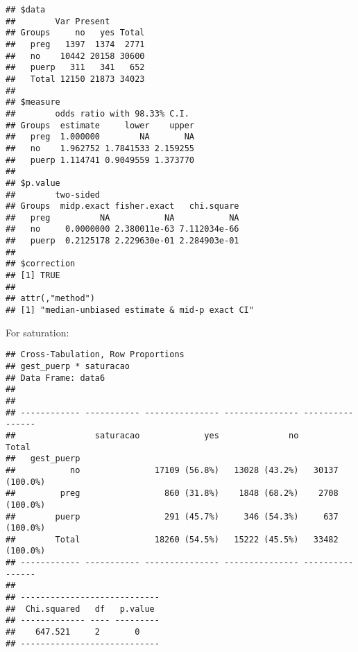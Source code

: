 \documentclass[
]{article}
\newenvironment{Shaded}{\begin{snugshade}}{\end{snugshade}}
\newcommand{\DataTypeTok}[1]{\textcolor[rgb]{0.13,0.29,0.53}{#1}}
\newcommand{\KeywordTok}[1]{\textcolor[rgb]{0.13,0.29,0.53}{\textbf{#1}}}
\newcommand{\NormalTok}[1]{#1}
\newcommand{\OperatorTok}[1]{\textcolor[rgb]{0.81,0.36,0.00}{\textbf{#1}}}
\newcommand{\OtherTok}[1]{\textcolor[rgb]{0.56,0.35,0.01}{#1}}
\newcommand{\StringTok}[1]{\textcolor[rgb]{0.31,0.60,0.02}{#1}}
\begin{document}
\begin{verbatim}
## $data
##        Var Present
## Groups     no   yes Total
##   preg   1397  1374  2771
##   no    10442 20158 30600
##   puerp   311   341   652
##   Total 12150 21873 34023
## 
## $measure
##        odds ratio with 98.33% C.I.
## Groups  estimate     lower    upper
##   preg  1.000000        NA       NA
##   no    1.962752 1.7841533 2.159255
##   puerp 1.114741 0.9049559 1.373770
## 
## $p.value
##        two-sided
## Groups  midp.exact fisher.exact   chi.square
##   preg          NA           NA           NA
##   no     0.0000000 2.380011e-63 7.112034e-66
##   puerp  0.2125178 2.229630e-01 2.284903e-01
## 
## $correction
## [1] TRUE
## 
## attr(,"method")
## [1] "median-unbiased estimate & mid-p exact CI"
\end{verbatim}

For saturation:

\begin{Shaded}
\end{Shaded}

\begin{verbatim}
## Cross-Tabulation, Row Proportions  
## gest_puerp * saturacao  
## Data Frame: data6  
## 
## 
## ------------ ----------- --------------- --------------- ----------------
##                saturacao             yes              no            Total
##   gest_puerp                                                             
##           no               17109 (56.8%)   13028 (43.2%)   30137 (100.0%)
##         preg                 860 (31.8%)    1848 (68.2%)    2708 (100.0%)
##        puerp                 291 (45.7%)     346 (54.3%)     637 (100.0%)
##        Total               18260 (54.5%)   15222 (45.5%)   33482 (100.0%)
## ------------ ----------- --------------- --------------- ----------------
## 
## ----------------------------
##  Chi.squared   df   p.value 
## ------------- ---- ---------
##    647.521     2       0    
## ----------------------------
\end{verbatim}

\begin{Shaded}
\end{Shaded}
\end{document}
